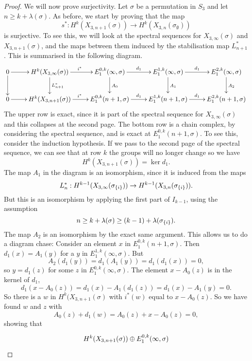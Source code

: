 \begin{proof}
We will now prove surjectivity. Let $\sigma$ be a permutation in $S_3$
and let $n \geq k + \lambda(\sigma)$. As before, we start by proving
that the map
\[ s^* : H^k(X_{3,n+1}(\sigma)) \to
H^k(X_{3,n}(\sigma_{\emptyset})) \] 
is surjective. To see this, we will look at the spectral sequences for
$X_{3,\infty}(\sigma)$ and $X_{3,n+1}(\sigma)$, and the maps between
them induced by the stabilisation map $L^*_{n+1}$. This is summarised in
the following diagram. 
\[ \xymatrix{ 0 \ar[r]\ar[d] & H^k(X_{3,\infty}(\sigma))
  \ar[r]^{i^*}\ar[d]^{L^*_{n+1}} & E_1^{0,k}(\infty,\sigma)
  \ar[r]^{d_1}\ar[d]^{A_0} & 
  E_1^{1,k}(\infty,\sigma) \ar[r]^{d_1}\ar[d]^{A_1} &
  E_1^{2,k}(\infty,\sigma) \ar[d]^{A_2} \\
  0 \ar[r] & H^k(X_{3,n+1}(\sigma)) \ar[r]^{i^*} &
  E_1^{0,k}(n+1,\sigma) \ar[r]^{d_1} & E_1^{1,k}(n+1,\sigma)
  \ar[r]^{d_1} & E_1^{2,k}(n+1,\sigma) 
} \]
The upper row is exact, since it is part of the spectral sequence for
$X_{3,\infty}(\sigma)$ and this collapses at the second page. The
bottom row is a chain complex, by considering the spectral sequence,
and is exact at
$E_1^{0,k}(n+1,\sigma)$. To see this, consider the induction
hypothesis. If we pass to the second page of the spectral sequence, we
can see that at row $k$ the groups will no longer change so we have
\[ H^k(X_{3,n+1}(\sigma)) = \ker d_1. \] 
The map $A_1$ in the diagram is an isomorphism, since it is induced from
the maps
\[ L^*_{n} : H^{k-1}(X_{3,\infty}(\sigma_{\left\{ i \right\}})) \to
H^{k-1}(X_{3,n}(\sigma_{\left\{ i \right\}})). \]
But this is an isomorphism by applying the first part of $I_{k-1}$,
using the assumption 
\[ n \geq k+\lambda(\sigma) \geq
(k-1)+\lambda(\sigma_{\left\{ i \right\}}). \]
The map $A_2$ is an isomorphism by the exact same argument.
This allows us to do a diagram chase: Consider an element $x$ in
$E_1^{0,k}(n+1,\sigma)$. Then $d_1(x) = A_1(y)$ for a $y$ in
$E_1^{1,k}(\infty,\sigma)$. But 
\[ A_2(d_1(y)) = d_1(A_1(y)) = d_1(d_1(x)) = 0, \]
so $y = d_1(z)$ for some $z$ in $E_1^{0,k}(\infty,\sigma)$. The
element $x - A_0(z)$ is in the kernel of $d_1$,
\[ d_1(x - A_0(z)) = d_1(x) - A_1(d_1(z)) = d_1(x) - A_1(y) = 0. \]
So there is a $w$ in $H^k(X_{3,n+1}(\sigma)$ with $i^*(w)$ equal to
$x-A_0(z)$. So we have found $w$ and $z$ with
\[ A_0(z) + d_1(w) = A_0(z) + x - A_0(z) = 0, \]
showing that
\[ \xymatrix{ H^k(X_{3,n+1}(\sigma)) \oplus E_1^{0,k}(\infty,\sigma)
}\]
\end{proof}
